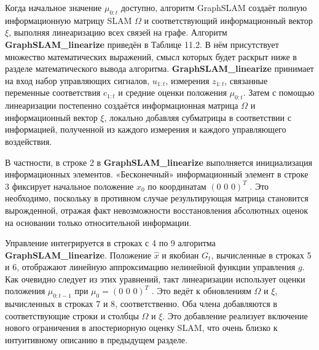 \documentclass[10pt,a4paper]{article}
\begin{document}
Когда начальное значение $\mu_{0:t}$ доступно, алгоритм GraphSLAM создаёт полную информационную матрицу SLAM $\varOmega$ и соответствующий информационный вектор $\xi$, выполняя линеаризацию всех связей на графе. Алгоритм \textbf{GraphSLAM\_linearize} приведён в Таблице 11.2. В нём присутствует множество математических выражений, смысл которых будет раскрыт ниже в разделе математического вывода алгоритма. \textbf{GraphSLAM\_linearize} принимает на вход набор управляющих сигналов, $u_{1:t}$, измерения $z_{1:t}$, связанные переменные соответствия $c_{1:t}$ и средние оценки положения $\mu_{0:t}$. Затем с помощью линеаризации постепенно создаётся информационная матрица $\varOmega$ и информационный вектор $\xi$, локально добавляя субматрицы в соответствии с информацией, полученной из каждого измерения и каждого управляющего воздействия.

В частности, в строке 2 в \textbf{GraphSLAM\_linearize} выполняется инициализация информационных элементов. «Бесконечный» информационный элемент в строке 3 фиксирует начальное положение $x_0$ по координатам $(0\,\,0\,\,0)^T$ . Это необходимо, поскольку в противном случае результирующая матрица становится вырожденной, отражая факт невозможности восстановления абсолютных оценок на основании только относительной информации.

Управление интегрируется в строках с 4 по 9 алгоритма \textbf{GraphSLAM\_linearize}. Положение $\hat{x}$ и якобиан $G_t$, вычисленные в строках 5 и 6, отображают линейную аппроксимацию нелинейной функции управления $g$. Как очевидно следует из этих уравнений, такт линеаризации использует оценки положения $\mu_{0:t-1}$ при $\mu_0=(0\,\,0\,\,0)^T$ . Это ведёт к обновлениям $\varOmega$ и $\xi$, вычисленных в строках 7 и 8, соответственно. Оба члена добавляются в соответствующие строки и столбцы $\varOmega$ и $\xi$.  Это добавление реализует включение нового ограничения в апостериорную оценку SLAM, что очень близко к интуитивному описанию в предыдущем разделе.
\end{document}
